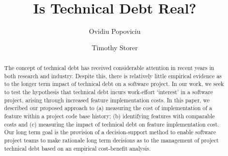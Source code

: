 \documentclass[sigconf]{acmart}
\begin{document}
\title{Is Technical Debt Real?}

\author{Ovidiu Popoviciu}

\author{Timothy Storer}





\begin{abstract}
The concept of technical debt has received considerable attention in 
recent years in both research and industry.  Despite this, there is 
relatively little empirical evidence as to the longer term impact of 
technical debt on a software project.  In our work, we seek to test the 
hypothesis that technical debt incurs work-effort `interest' in a 
software project, arising through increased feature implementation 
costs.  In this paper, we described our proposed approach to (a) 
measuring the cost of implementation of a feature within a project code 
base history; (b) identifying features with comparable costs and (c) 
measuring the impact of technical debt on feature implementation cost.  
Our long term goal is the provision of a decision-support method to enable 
software project teams to make rationale long term decisions as to the 
management of project technical debt based on an empirical cost-benefit 
analysis.
\end{abstract}
\end{document}
